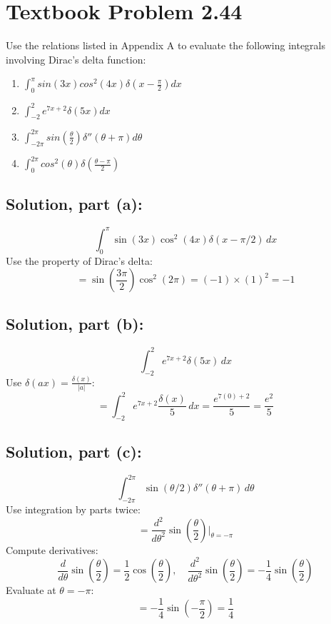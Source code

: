 \documentclass[12pt]{article}
\begin{document}
\section*{Textbook Problem 2.44}
    Use the relations listed in Appendix A to evaluate the following integrals involving Dirac's delta function:
    \begin{enumerate}
        \item [(a)] $\int_0^\pi sin(3x) cos^2(4x) \delta(x-\frac{\pi}{2})dx $
        \item [(b)] $\int_{-2}^2 e^{7x+2} \delta(5x) dx$
        \item [(c)] $\int_{-2\pi}^{2\pi} sin(\frac{\theta}{2})\delta''(\theta+\pi)d\theta$
        \item [(d)] $\int_0^{2\pi} cos^2(\theta)\delta(\frac{\theta-\pi}{2})$
    \end{enumerate}
    
    
    
    



    \subsection*{Solution, part (a):}
        \[
        \int_0^\pi \sin(3x)\cos^2(4x)\delta(x-\pi/2)\,dx
        \]
        Use the property of Dirac's delta:
        \[
        = \sin\left(\frac{3\pi}{2}\right)\cos^2(2\pi) = (-1) \times (1)^2 = -1
        \]

    \subsection*{Solution, part (b):}
        \[
        \int_{-2}^{2} e^{7x+2}\delta(5x)\,dx
        \]
        Use \(\delta(ax) = \frac{\delta(x)}{|a|}\):
        \[
        = \int_{-2}^{2} e^{7x+2}\frac{\delta(x)}{5}\,dx = \frac{e^{7(0)+2}}{5} = \frac{e^2}{5}
        \]

    \subsection*{Solution, part (c):}
        \[
        \int_{-2\pi}^{2\pi} \sin(\theta/2)\delta''(\theta+\pi)\,d\theta
        \]
        Use integration by parts twice:
        \[
        = \frac{d^2}{d\theta^2}\sin\left(\frac{\theta}{2}\right)\bigg|_{\theta=-\pi} 
        \]
        Compute derivatives:
        \[
        \frac{d}{d\theta}\sin\left(\frac{\theta}{2}\right)=\frac{1}{2}\cos\left(\frac{\theta}{2}\right), \quad \frac{d^2}{d\theta^2}\sin\left(\frac{\theta}{2}\right)=-\frac{1}{4}\sin\left(\frac{\theta}{2}\right)
        \]
        Evaluate at \(\theta=-\pi\):
        \[
        = -\frac{1}{4}\sin\left(-\frac{\pi}{2}\right) = \frac{1}{4}
        \]
\end{document}
